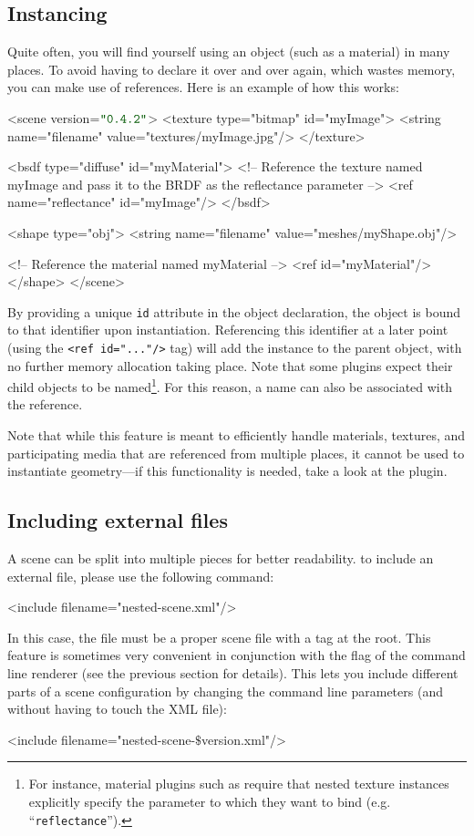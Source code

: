 \subsection{Instancing}
Quite often, you will find yourself using an object (such as a material) in many places. To avoid having
to declare it over and over again, which wastes memory, you can make use of references. Here is an example
of how this works:
\begin{xml}
<scene version=$\MtsVer$>
	<texture type="bitmap" id="myImage">
		<string name="filename" value="textures/myImage.jpg"/>
	</texture>

	<bsdf type="diffuse" id="myMaterial">
		<!-- Reference the texture named myImage and pass it
			to the BRDF as the reflectance parameter -->
		<ref name="reflectance" id="myImage"/>
	</bsdf>

	<shape type="obj">
		<string name="filename" value="meshes/myShape.obj"/>

		<!-- Reference the material named myMaterial -->
		<ref id="myMaterial"/>
	</shape>
</scene>
\end{xml}
By providing a unique \texttt{id} attribute in the
object declaration, the object is bound to that identifier
upon instantiation.
Referencing this identifier at a later point (using the \texttt{<ref id="..."/>} tag)
will add the instance to the parent object, with no further memory
allocation taking place. Note that some plugins expect their child objects
to be named\footnote{For instance, material plugins such as  require that
nested texture instances explicitly specify the parameter to which they want to bind (e.g. ``\texttt{reflectance}'').}.
For this reason, a name can also be associated with the reference.

Note that while this feature is meant to efficiently handle materials,
textures, and participating media that are referenced from multiple places,
it cannot be used to instantiate geometry---if this functionality is needed,
take a look at the  plugin.

\subsection{Including external files}
A scene can be split into multiple pieces for better readability.
to include an external file, please use the following command:
\begin{xml}
<include filename="nested-scene.xml"/>
\end{xml}
In this case, the file  must be a proper scene file with a  tag at the root.
This feature is sometimes very convenient in conjunction with the  flag of the  command line renderer (see the previous section for details).
This lets you include different parts of a scene configuration by changing the command line parameters (and without having to touch the XML file):
\begin{xml}
<include filename="nested-scene-$\texttt{\$}$version.xml"/>
\end{xml}
